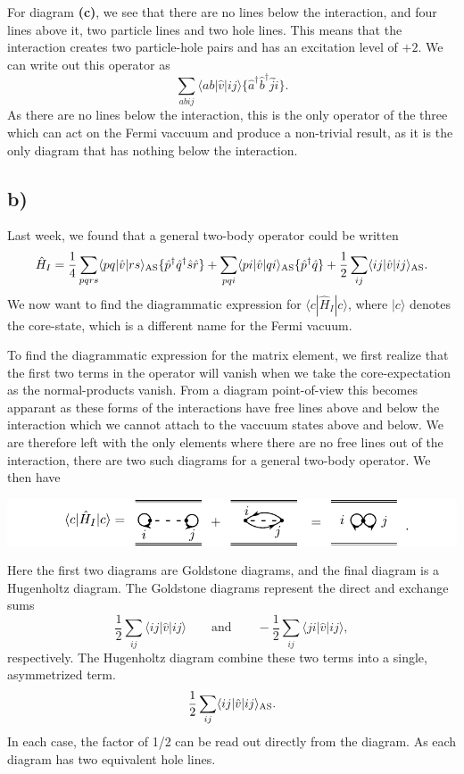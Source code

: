 \documentclass[a4paper, 11pt, notitlepage, english]{article}
\newcommand{\ket}[1]{|#1 \rangle}
\newcommand{\op}[1]{\hat{#1}}
\newcommand{\braopket}[3]{\langle #1 | {#2} | #3 \rangle}
\begin{document}
For diagram \textbf{(c)}, we see that there are no lines below the interaction, and four lines above it, two particle lines and two hole lines. This means that the interaction creates two particle-hole pairs and has an excitation level of $+2$. We can write out this operator as
$$\sum_{abij}\braopket{ab}{\op{v}}{ij}\{\op{a}^\dagger\op{b}^\dagger\op{j}\op{i}\}.$$
As there are no lines below the interaction, this is the only operator of the three which can act on the Fermi vaccuum and produce a non-trivial result, as it is the only diagram that has nothing below the interaction.

\subsection*{b)}
Last week, we found that a general two-body operator could be written
$$\op{H}_I = \frac{1}{4}\sum_{pqrs}\braopket{pq}{\op{v}}{rs}_{\rm AS}\{\op{p}^\dagger \op{q}^\dagger\op{s}\op{r}\} + \sum_{pqi}\braopket{pi}{\op{v}}{qi}_{\rm AS}\{\op{p}^\dagger\op{q}\} + \frac{1}{2}\sum_{ij}\braopket{ij}{\op{v}}{ij}_{\rm AS}.$$
We now want to find the diagrammatic expression for $\braopket{c}{\op{H}_I}{c}$, where $\ket{c}$ denotes the core-state, which is a different name for the Fermi vacuum. 

To find the diagrammatic expression for the matrix element, we first realize that the first two terms in the operator will vanish when we take the core-expectation as the normal-products vanish. From a diagram point-of-view this becomes apparant as these forms of the interactions have free lines above and below the interaction which we cannot attach to the vaccuum states above and below. We are therefore left with the only elements where there are no free lines out of the interaction, there are two such diagrams for a general two-body operator. We then have
\begin{center}
	\includegraphics[width=\textwidth]{exercise9b}
\end{center}
Here the first two diagrams are Goldstone diagrams, and the final diagram is a Hugenholtz diagram. The Goldstone diagrams represent the direct and exchange sums
$$\frac{1}{2}\sum_{ij} \braopket{ij}{\op{v}}{ij} \qquad \mbox{and} \qquad -\frac{1}{2}\sum_{ij} \braopket{ji}{\op{v}}{ij},$$
respectively. The Hugenholtz diagram combine these two terms into a single, asymmetrized term.
$$\frac{1}{2}\sum_{ij} \braopket{ij}{\op{v}}{ij}_{\rm AS}.$$
In each case, the factor of 1/2 can be read out directly from the diagram. As each diagram has two equivalent hole lines.
\end{document}
